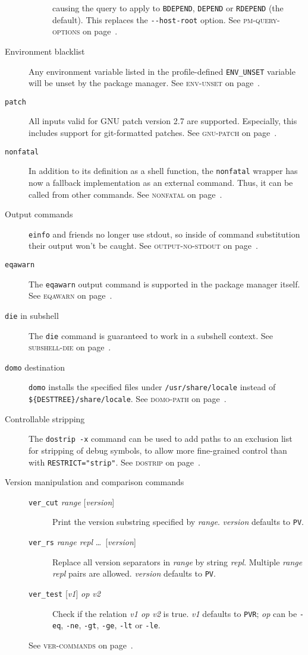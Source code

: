 \documentclass[a4paper,nofoldmark]{leaflet}
\newcommand{\code}[1]{\texttt{#1}}
\newcommand{\featureref}[1]{\textsc{#1} on page~\pageref{feat:#1}}
\begin{document}
\begin{description}
\begin{description}
        causing the query to apply to \code{BDEPEND}, \code{DEPEND}
        or \code{RDEPEND} (the default). This replaces the
        \code{-{}-host-root} option.
        See \featureref{pm-query-options}.
    \end{description}
    \item[Environment blacklist] Any environment variable listed in
    the profile-defined \code{ENV_UNSET} variable will be unset by the
    package manager.
    See \featureref{env-unset}.
    \item[\code{patch}] All inputs valid for GNU patch version 2.7
    are supported. Especially, this includes support for git-formatted
    patches.
    See \featureref{gnu-patch}.
    \item[\code{nonfatal}] In addition to its definition as a shell
    function, the \code{nonfatal} wrapper has now a fallback
    implementation as an external command. Thus, it can be called
    from other commands.
    See \featureref{nonfatal}.
    \item[Output commands] \code{einfo} and friends no longer use
    stdout, so inside of command substitution their output won't be
    caught.
    See \featureref{output-no-stdout}.
    \item[\code{eqawarn}] The \code{eqawarn} output command is
    supported in the package manager itself.
    See \featureref{eqawarn}.
    \item[\code{die} in subshell] The \code{die} command is guaranteed
    to work in a subshell context.
    See \featureref{subshell-die}.
    \item[\code{domo} destination] \code{domo} installs the specified
    files under \code{/usr/share/locale} instead of
    \code{\$\{DESTTREE\}/\allowbreak share/locale}.
    See \featureref{domo-path}.
    \item[Controllable stripping] The \code{dostrip -x} command can be
    used to add paths to an exclusion list for stripping of debug
    symbols, to allow more fine-grained control than with
    \code{RESTRICT="strip"}.
    See \featureref{dostrip}.
    \item[Version manipulation and comparison commands] \mbox{}
    \begin{description}
        \item[\code{ver_cut} \emph{range} {[\emph{version}]}]
        Print the version substring specified by \emph{range}.
        \emph{version} defaults to \code{PV}.
        \item[\code{ver_rs} \emph{range repl} \dots\ {[\emph{version}]}]
        Replace all version separators in \emph{range} by string
        \emph{repl}. Multiple \emph{range repl} pairs are allowed.
        \emph{version} defaults to \code{PV}.
        \item[\code{ver_test} {[\emph{v1}]} \emph{op  v2}]
        Check if the relation \emph{v1 op v2} is true.
        \emph{v1} defaults to \code{PVR}; \emph{op} can be \code{-eq},
        \code{-ne}, \code{-gt}, \code{-ge}, \code{-lt} or \code{-le}.
    \end{description}
    See \featureref{ver-commands}.
\end{description}
\end{document}
